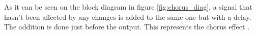 As it can be seen on the block diagram in figure \autoref{fig:chorus_diag}, a signal that hasn't been affected by any changes is added to the same one but with a delay. The addition is done just before the output. This represents the chorus effect \citep{chorus_projectpaper}. \\









